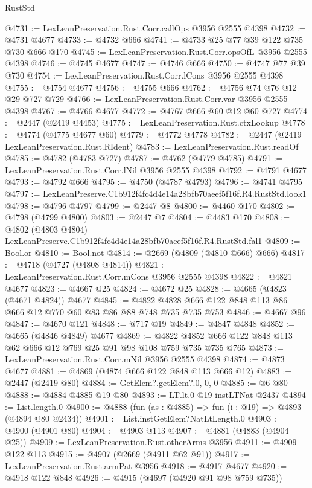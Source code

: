 \begin{lexlean}{RustStd}
\begin{coremodule}
@4731 := LexLeanPreservation.Rust.Corr.callOps @3956 @2555 @4398
@4732 := @4731 @4677
@4733 := @4732 @666
@4741 := @4733 @25 @77 @39 @122 @735 @730 @666 @170
@4745 := LexLeanPreservation.Rust.Corr.opsOfL @3956 @2555 @4398
@4746 := @4745 @4677
@4747 := @4746 @666
@4750 := @4747 @77 @39 @730
@4754 := LexLeanPreservation.Rust.Corr.lCons @3956 @2555 @4398
@4755 := @4754 @4677
@4756 := @4755 @666
@4762 := @4756 @74 @76 @12 @29 @727 @729
@4766 := LexLeanPreservation.Rust.Corr.var @3956 @2555 @4398
@4767 := @4766 @4677
@4772 := @4767 @666 @60 @12 @60 @727
@4774 := @2447 (@2419 @4453)
@4775 := LexLeanPreservation.Rust.ctxLookup
@4778 := @4774 (@4775 @4677 @60)
@4779 := @4772 @4778
@4782 := @2447 (@2419 LexLeanPreservation.Rust.RIdent)
@4783 := LexLeanPreservation.Rust.readOf
@4785 := @4782 (@4783 @727)
@4787 := @4762 (@4779 @4785)
@4791 := LexLeanPreservation.Rust.Corr.lNil @3956 @2555 @4398
@4792 := @4791 @4677
@4793 := @4792 @666
@4795 := @4750 (@4787 @4793)
@4796 := @4741 @4795
@4797 := LexLeanPreserve.C1b912f4fc4d4e14a28bfb70aeef5f16f.R4.RustStd.look1
@4798 := @4796 @4797
@4799 := @2447 @8
@4800 := @4460 @170
@4802 := @4798 (@4799 @4800)
@4803 := @2447 @7
@4804 := @4483 @170
@4808 := @4802 (@4803 @4804) LexLeanPreserve.C1b912f4fc4d4e14a28bfb70aeef5f16f.R4.RustStd.fal1
@4809 := Bool.or
@4810 := Bool.not
@4814 := @2669 (@4809 (@4810 @666) @666)
@4817 := @4718 (@4727 (@4808 @4814))
@4821 := LexLeanPreservation.Rust.Corr.mCons @3956 @2555 @4398
@4822 := @4821 @4677
@4823 := @4667 @25
@4824 := @4672 @25
@4828 := @4665 (@4823 (@4671 @4824)) @4677
@4845 := @4822 @4828 @666 @122 @848 @113 @86 @666 @12 @770 @60 @83 @86 @88 @748 @735 @735 @753
@4846 := @4667 @96
@4847 := @4670 @121
@4848 := @717 @19
@4849 := @4847 @4848
@4852 := @4665 (@4846 @4849) @4677
@4869 := @4822 @4852 @666 @122 @848 @113 @62 @666 @12 @769 @25 @91 @98 @108 @759 @735 @735 @765
@4873 := LexLeanPreservation.Rust.Corr.mNil @3956 @2555 @4398
@4874 := @4873 @4677
@4881 := @4869 (@4874 @666 @122 @848 @113 @666 @12)
@4883 := @2447 (@2419 @80)
@4884 := GetElem?.getElem?.{0, 0, 0}
@4885 := @6 @80
@4888 := @4884 @4885 @19 @80
@4893 := LT.lt.{0} @19 instLTNat @2437
@4894 := List.length.{0}
@4900 := @4888 (fun (as : @4885) => fun (i : @19) => @4893 (@4894 @80 @2434))
@4901 := List.instGetElem?NatLtLength.{0}
@4903 := @4900 (@4901 @80)
@4904 := @4903 @113
@4907 := @4881 (@4883 (@4904 @25))
@4909 := LexLeanPreservation.Rust.otherArms @3956
@4911 := @4909 @122 @113
@4915 := @4907 (@2669 (@4911 @62 @91))
@4917 := LexLeanPreservation.Rust.armPat @3956
@4918 := @4917 @4677
@4920 := @4918 @122 @848
@4926 := @4915 (@4697 (@4920 @91 @98 @759 @735))

\end{coremodule}
\end{lexlean}

